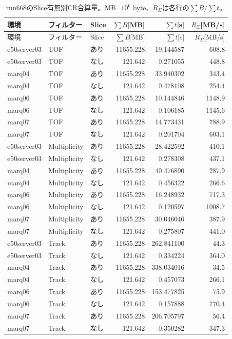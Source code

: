 \begingroup\small\begin{longtable}{lllrrr}
\caption{run668のSlice有無別CR合算量。MB=$10^6$ byte、$R_\Sigma$は各行の$\sum B/\sum t$。}\\
\hline 環境 & フィルター & Slice & $\sum B$[MB] & $\sum t$[s] & $R_\Sigma$[MB/s] \\\hline\endfirsthead
\hline 環境 & フィルター & Slice & $\sum B$[MB] & $\sum t$[s] & $R_\Sigma$[MB/s] \\\hline\endhead
e50server03 & TOF & あり & 11655.228 & 19.144587 & 608.8 \\
e50server03 & TOF & なし & 121.642 & 0.271055 & 448.8 \\
marq04 & TOF & あり & 11655.228 & 33.940302 & 343.4 \\
marq04 & TOF & なし & 121.642 & 0.478108 & 254.4 \\
marq06 & TOF & あり & 11655.228 & 10.144846 & 1148.9 \\
marq06 & TOF & なし & 121.642 & 0.106185 & 1145.6 \\
marq07 & TOF & あり & 11655.228 & 14.773431 & 788.9 \\
marq07 & TOF & なし & 121.642 & 0.201704 & 603.1 \\
e50server03 & Multiplicity & あり & 11655.228 & 28.422592 & 410.1 \\
e50server03 & Multiplicity & なし & 121.642 & 0.278308 & 437.1 \\
marq04 & Multiplicity & あり & 11655.228 & 40.476890 & 287.9 \\
marq04 & Multiplicity & なし & 121.642 & 0.456322 & 266.6 \\
marq06 & Multiplicity & あり & 11655.228 & 16.248932 & 717.3 \\
marq06 & Multiplicity & なし & 121.642 & 0.120597 & 1008.7 \\
marq07 & Multiplicity & あり & 11655.228 & 30.046046 & 387.9 \\
marq07 & Multiplicity & なし & 121.642 & 0.275807 & 441.0 \\
e50server03 & Track & あり & 11655.228 & 262.841100 & 44.3 \\
e50server03 & Track & なし & 121.642 & 0.334224 & 364.0 \\
marq04 & Track & あり & 11655.228 & 338.034016 & 34.5 \\
marq04 & Track & なし & 121.642 & 0.457073 & 266.1 \\
marq06 & Track & あり & 11655.228 & 153.477825 & 75.9 \\
marq06 & Track & なし & 121.642 & 0.157888 & 770.4 \\
marq07 & Track & あり & 11655.228 & 206.705797 & 56.4 \\
marq07 & Track & なし & 121.642 & 0.350282 & 347.3 \\
\hline\end{longtable}\endgroup
